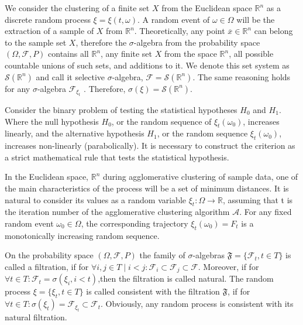 We consider the clustering of a finite set \(X\) from the Euclidean space \(\mathbb{R}^n\) as a discrete random process \(\xi = \xi(t,\omega)\). A random event of \(\omega \in \Omega\) will be the extraction of a sample of \(X\) from \(\mathbb{R}^n\). Theoretically, any point \(\overline{x} \in \mathbb{R}^n\) can belong to the sample set \(X\), therefore the \(\sigma\)-algebra from the probability space \((\Omega, \mathcal{F}, P)\) contains all \(\mathbb{R}^n\), any finite set \(X\) from the space \(\mathbb{R}^n\), all possible countable unions of such sets, and additions to it. We denote this set system as \(\mathcal{S}(\mathbb{R}^n)\) and call it selective $\sigma$-algebra, \(\mathcal{F} = \mathcal{S}(\mathbb{R}^n)\). The same reasoning holds for any $\sigma$-algebra \(\mathcal{F}_{\xi_t}\) . Therefore, \(\sigma(\xi) = \mathcal{S}(\mathbb{R}^n)\).

Consider the binary problem of testing the statistical hypotheses \(H_0\) and \(H_1\). Where the null hypothesis \(H_0\), or the random sequence of \(\xi_t(\omega_0)\), increases linearly, and the alternative hypothesis \(H_1\), or the random sequence \(\xi_t(\omega_0)\), increases non-linearly (parabolically). It is necessary to construct the criterion as a strict mathematical rule that tests the statistical hypothesis.

In the Euclidean space, \(\mathbb{R}^n\) during agglomerative clustering of sample data, one of the main characteristics of the process will be a set of minimum distances. It is natural to consider its values as a random variable \(\xi_t : \Omega \longrightarrow \mathbb{R}\), assuming that t is the iteration number of the agglomerative clustering algorithm $\mathcal{A}$. For any fixed random event \(\omega_0 \in \Omega\), the corresponding trajectory \(\xi_t(\omega_0) = F_t\) is a monotonically increasing random sequence.

On the probability space \((\Omega, \mathcal{F}, P)\) the family of $\sigma$-algebras \(\mathfrak{F} = \{\mathcal{F}_t, t \in T\}\) is called a filtration, if for \(\forall i, j \in T \mid i < j: \mathcal{F}_i \subset \mathcal{F}_j \subset \mathcal{F}\). Moreover, if for \(\forall t \in T: \mathcal{F}_t = \sigma(\xi_i, i < t)\),then the filtration is called natural. The random process \(\xi = \{\xi_t, t \in T\}\) is called consistent with the filtration $\mathfrak{F}$, if for \(\forall t \in T :\sigma (\xi_t) = \mathcal{F}_{\xi_t} \subset \mathcal{F}_t\). Obviously, any random process is consistent with its natural filtration.

